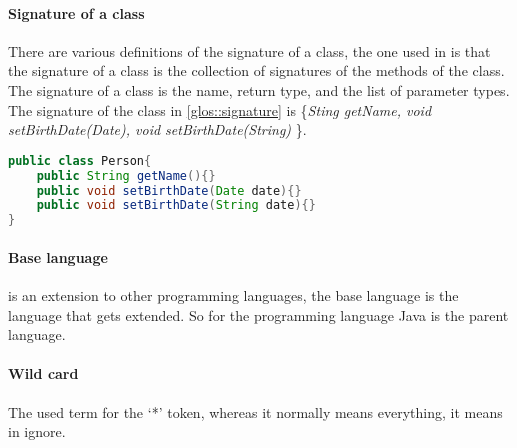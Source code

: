 \paragraph{Signature of a class} There are various definitions of the signature of a class, the one used in \Compose* is
that the signature of a class is the collection of signatures of the methods of the class. The signature of a class
is the name, return type, and the list of parameter types. The signature of the class in \autoref{glos::signature}
is \{\emph{Sting getName, void setBirthDate(Date), void setBirthDate(String)} \}.

\begin{lstlisting}[caption={Example class in Java},label=glos::signature,float=h,language=Java,style=listing]
public class Person{
	public String getName(){}
	public void setBirthDate(Date date){}
	public void setBirthDate(String date){}
}
\end{lstlisting}

\paragraph{Base language} \Compose* is an extension to other programming languages, the base language is the language
that gets extended. So for \Compose*[Java] the programming language Java is the parent language.

\paragraph{Wild card} The used term for the `*' token, whereas it normally means everything, it means in \Compose*
ignore.